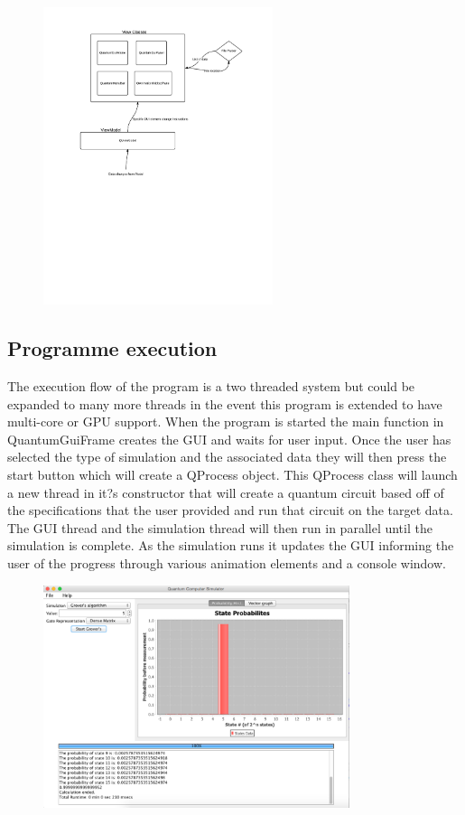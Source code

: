 \documentclass[bibliography=totocnumbered, 10pt]{article}
\theoremstyle{NoticeStyle}
\begin{document}
\begin{figure}[H]
\centering
\includegraphics[width=0.6\textwidth]{img/GuiOverall.pdf}
\caption{}
\end{figure}

\subsection{Programme execution}
The execution flow of the program is a two threaded system but could be expanded to many more threads in the event this program is extended to have multi-core or GPU support. When the program is started the main function in QuantumGuiFrame creates the GUI and waits for user input.  Once the user has selected the type of simulation and the associated data they will then press the start button which will create a QProcess object.  This QProcess class will launch a new thread in it?s constructor that will create a quantum circuit based off of the specifications that the user provided and run that circuit on the target data. The GUI thread and the simulation thread will then run in parallel until the simulation is complete. As the simulation runs it updates the GUI informing the user of the progress through various animation elements and a console window.

\begin{figure}[H]
\centering
\includegraphics[width=0.8\textwidth]{img/program_example.pdf}
\caption{}
\end{figure}
\end{document}
